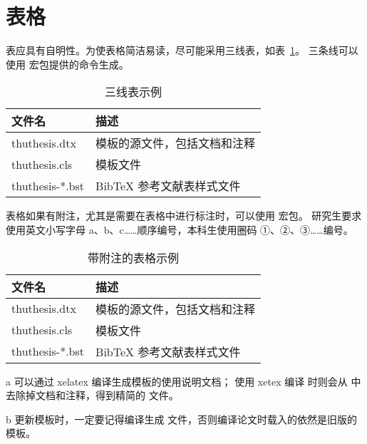 \section{表格}

表应具有自明性。为使表格简洁易读，尽可能采用三线表，如表~\ref{tab:three-line}。
三条线可以使用  宏包提供的命令生成。

\begin{table}
	\centering
	\caption{三线表示例}
	\begin{tabular}{ll}
		\toprule
		文件名          & 描述                         \\
		\midrule
		thuthesis.dtx   & 模板的源文件，包括文档和注释 \\
		thuthesis.cls   & 模板文件                     \\
		thuthesis-*.bst & BibTeX 参考文献表样式文件    \\
		\bottomrule
	\end{tabular}
	\label{tab:three-line}
\end{table}

表格如果有附注，尤其是需要在表格中进行标注时，可以使用  宏包。
研究生要求使用英文小写字母 a、b、c……顺序编号，本科生使用圈码 ①、②、③……编号。

\begin{table}
	\centering
	\begin{threeparttable}[c]
		\caption{带附注的表格示例}
		\label{tab:three-part-table}
		\begin{tabular}{ll}
			\toprule
			文件名                 & 描述                         \\
			\midrule
			thuthesis.dtx\tnote{a} & 模板的源文件，包括文档和注释 \\
			thuthesis.cls\tnote{b} & 模板文件                     \\
			thuthesis-*.bst        & BibTeX 参考文献表样式文件    \\
			\bottomrule
		\end{tabular}
		\begin{tablenotes}
			\item [a] 可以通过 xelatex 编译生成模板的使用说明文档；
			使用 xetex 编译  时则会从  中去除掉文档和注释，得到精简的  文件。
			\item [b] 更新模板时，一定要记得编译生成  文件，否则编译论文时载入的依然是旧版的模板。
		\end{tablenotes}
	\end{threeparttable}
\end{table}

